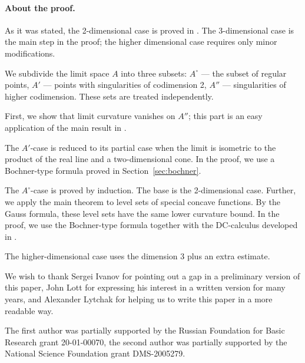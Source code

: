 \paragraph{About the proof.}
As it was stated, the 2-dimensional case is proved in \cite[VII \S13]{AZ}.
The 3-dimensional case is the main step in the proof;
the higher dimensional case requires only minor modifications.

We subdivide the limit space $A$ into
three subsets: $A^\circ$ --- the subset of regular 
points, $A'$ --- points with singularities of codimension 2,
$A''$ --- singularities of higher codimension.
These sets are treated independently.

First, we show that limit curvature vanishes on $A''$; 
this part is an easy application of the main result in \cite{petrunin-SC}.

The $A'$-case is reduced to its partial case when the limit is isometric to the product of the real line and a two-dimensional cone.
In the proof, we use a Bochner-type formula proved in Section~\ref{sec:bochner}.

The $A^\circ$-case is proved by induction.
The base is the 2-dimensional case.
Further, we apply the main theorem to level sets of special concave functions.
By the Gauss formula, these level sets have the same lower curvature bound. 
In the proof, we use the Bochner-type formula together with the DC-calculus developed in \cite{PerDC}.

The higher-dimensional case uses the dimension 3 plus an extra estimate.

We wish to thank Sergei Ivanov for pointing out a gap in a preliminary version of this paper,
John Lott for expressing his interest in a written version for many years,
and Alexander Lytchak for helping us to write this paper in a more readable way.

The first author was partially supported by the Russian Foundation for Basic Research grant 20-01-00070, 
the second author was partially supported by the National Science Foundation grant DMS-2005279.
